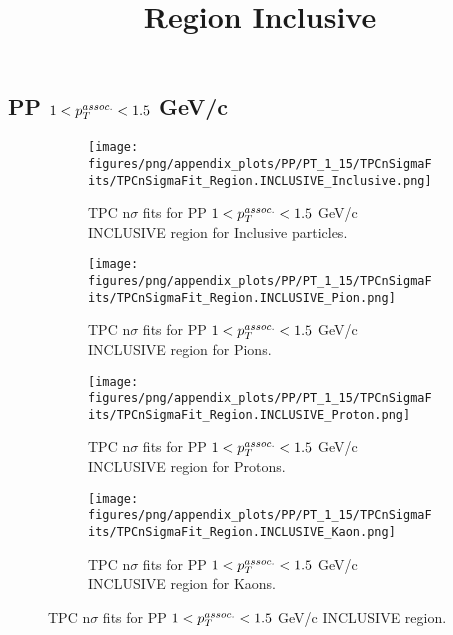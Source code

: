     
            \subsection{PP $1 < \pTassoc < 1.5$ GeV/c}
            \begin{figure}[H]
                \title{Region Inclusive}
                \begin{subfigure}[b]{0.5\textwidth}
                    \centering
                    \texttt{[image: figures/png/appendix\_plots/PP/PT\_1\_15/TPCnSigmaFits/TPCnSigmaFit\_Region.INCLUSIVE\_Inclusive.png]}
                    \caption{TPC n$\sigma$ fits for PP $1 < \pTassoc < 1.5$ GeV/c INCLUSIVE region for Inclusive particles.}
                    \label{fig:appendix_PP_$1 < \pTassoc < 1.5$ GeV/c_INCLUSIVE_Inclusive}
                \end{subfigure}
                \begin{subfigure}[b]{0.5\textwidth}
                    \centering
                    \texttt{[image: figures/png/appendix\_plots/PP/PT\_1\_15/TPCnSigmaFits/TPCnSigmaFit\_Region.INCLUSIVE\_Pion.png]}
                    \caption{TPC n$\sigma$ fits for PP $1 < \pTassoc < 1.5$ GeV/c INCLUSIVE region for Pions.}
                    \label{fig:appendix_PP_$1 < \pTassoc < 1.5$ GeV/c_INCLUSIVE_Pion}
                \end{subfigure}
                \begin{subfigure}[b]{0.5\textwidth}
                    \centering
                    \texttt{[image: figures/png/appendix\_plots/PP/PT\_1\_15/TPCnSigmaFits/TPCnSigmaFit\_Region.INCLUSIVE\_Proton.png]}
                    \caption{TPC n$\sigma$ fits for PP $1 < \pTassoc < 1.5$ GeV/c INCLUSIVE region for Protons.}
                    \label{fig:appendix_PP_$1 < \pTassoc < 1.5$ GeV/c_INCLUSIVE_Proton}
                \end{subfigure}
                \begin{subfigure}[b]{0.5\textwidth}
                    \centering
                    \texttt{[image: figures/png/appendix\_plots/PP/PT\_1\_15/TPCnSigmaFits/TPCnSigmaFit\_Region.INCLUSIVE\_Kaon.png]}
                    \caption{TPC n$\sigma$ fits for PP $1 < \pTassoc < 1.5$ GeV/c INCLUSIVE region for Kaons.}
                    \label{fig:appendix_PP_$1 < \pTassoc < 1.5$ GeV/c_INCLUSIVE_Kaon}
                \end{subfigure}
                \caption{TPC n$\sigma$ fits for PP $1 < \pTassoc < 1.5$ GeV/c INCLUSIVE region.}
                \label{fig:appendix_PP_$1 < \pTassoc < 1.5$ GeV/c_INCLUSIVE}
            \end{figure}
